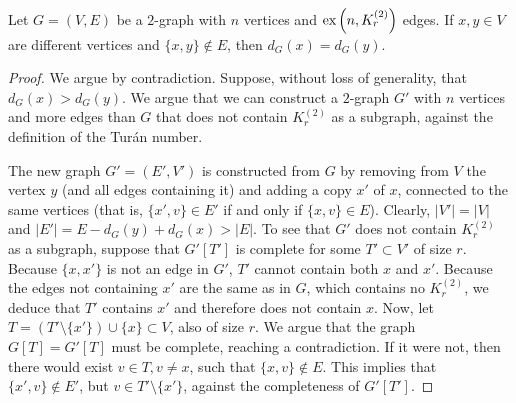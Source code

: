 \begin{lemma}\label{lem:same_degree}
    Let $G = (V, E)$ be a $2$-graph with $n$ vertices and
    $\text{ex} \left( n, K^{(2)}_{r} \right)$ edges.
    If $x, y \in V$ are different vertices and $\{x, y\} \notin E$, then $d_G(x) = d_G(y)$.
    \begin{proof}
        We argue by contradiction.
        Suppose, without loss of generality, that $d_G(x) > d_G(y)$.
        We argue that we can construct a $2$-graph $G'$ with $n$ vertices
        and more edges than $G$ that does not contain $K_r^{(2)}$ as a subgraph, against the definition of
        the Turán number.

        The new graph $G' = (E', V')$ is constructed from $G$ by removing from $V$ the vertex $y$
        (and all edges containing it)
        and adding a copy $x'$ of $x$, connected to the same vertices (that is, $\{x', v\} \in E'$
        if and only if $\{x, v\} \in E$).
        Clearly, $|V'| = |V|$ and $|E'| = E - d_G(y) + d_G(x) > |E|$.
        To see that $G'$ does not contain $K_r^{(2)}$ as a subgraph,
        suppose that $G'[T']$ is complete for some $T' \subset V'$ of size $r$.
        Because $\{x, x'\}$ is not an edge in $G'$, $T'$ cannot contain both $x$ and $x'$.
        Because the edges not containing $x'$ are the same as in $G$, which contains no $K_r^{(2)}$,
        we deduce that $T'$ contains $x'$ and therefore does not contain $x$.
        Now, let $T = (T' \setminus \{x'\}) \cup \{x\} \subset V$, also of size $r$.
        We argue that the graph $G[T] = G'[T]$ must be complete, reaching a contradiction.
        If it were not, then there would exist $v \in T, v \neq x$, such that $\{x, v\} \notin E$.
        This implies that $\{x', v\} \notin E'$, but $v \in T' \setminus \{x'\}$,
        against the completeness of $G'[T']$.
    \end{proof}
\end{lemma}

